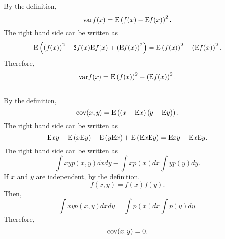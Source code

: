 \subsection{}
By the definition, 
%
\begin{equation}
{\rm var} f(x) = {\rm E} \left( f(x) - {\rm E} f(x) \right) ^ 2.
\end{equation}
%
The right hand side can be written as 
%
\begin{equation}
{\rm E} \left( \left( f(x) \right) ^ 2 - 2 f(x) {\rm E} f(x) + \left( {\rm E} f(x) \right) ^ 2 \right) = {\rm E} \left( f(x) \right) ^ 2 - \left( {\rm E} f(x) \right) ^ 2.
\end{equation}
%
Therefore, 
%
\begin{equation}
{\rm var} f(x) = {\rm E} \left( f(x) \right) ^ 2 - \left( {\rm E} f(x) \right) ^ 2.
\end{equation}
%


\subsection{}
\label{subsec_1_6}
By the definition,
%
\begin{equation}
{\rm cov} (x, y) = {\rm E} \left( \left( x - {\rm E} x \right) \left( y - {\rm E} y\right) \right).
\end{equation}
%
The right hand side can be written as
%
\begin{equation}
{\rm E} x y - {\rm E} \left( x {\rm E} y \right) - {\rm E} \left( y {\rm E} x \right) + {\rm E} \left( {\rm E} x {\rm E} y \right) = {\rm E} x y - {\rm E} x {\rm E} y.
\end{equation}
%
The right hand side can be written as
%
\begin{equation}
\int x y p(x, y) dx dy - \int x p(x) dx \int y p(y) dy.
\end{equation}
%
If $x$ and $y$ are independent, by the definition,
%
\begin{equation}
f(x, y) = f(x) f(y).
\end{equation}
%
Then,
%
\begin{equation}
\int x y p(x, y) dx dy = \int p(x) dx \int p(y) dy.
\end{equation}
%
Therefore,
%
\begin{equation}
{\rm cov} (x, y) = 0.
\end{equation}
%


